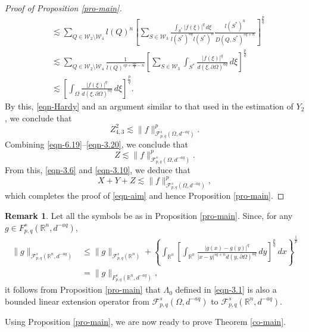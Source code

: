 \documentclass[11pt,twoside]{article}
\def\rn{{\mathbb{R}^n}}
\def\cf{{\mathcal F}}
\def\cw{\mathcal W}
\def\sxing{S^{*}}
\def\boz{{\Omega}}
\def\pa{\partial}                %
\def\huafwe{{\cf}_{p,q}^s(\boz,d^{-aq})}
\theoremstyle{mylem}
\theoremstyle{definition}
\newtheorem{remark}[theorem]{Remark}
\numberwithin{equation}{section}
\begin{document}
\begin{proof}[Proof of Proposition \ref{pro-main}]
\begin{align*}
&\lesssim \sum_{Q\in \cw_2\setminus\cw_4} l(Q)^n \left[\sum_{S\in\mathcal{W}_3} \frac{\int_{\sxing}|f(\xi)|^q \,d\xi}{l(\sxing)^{aq} l(\sxing)^n}  \frac{l(\sxing)^n}{D(Q,\sxing)^{sq+n}}\right]^{\frac{p}{q}} \\
&\lesssim \sum_{Q\in \cw_2\setminus\cw_4} \frac{1}{l(Q)^{sp+\frac{np}{q}-n}} \left[\sum_{S\in\mathcal{W}_3} \int_{\sxing} \frac{|f(\xi)|^q}{d(\xi,\pa\boz)^{aq}}\,d\xi \right]^{\frac{p}{q}} \\
&\lesssim \left[\int_{\boz} \frac{|f(\xi)|^q}{d(\xi,\pa\boz)^{aq}}\,d\xi \right]^{\frac{p}{q}}.
\end{align*}
By this, \eqref{eqn-Hardy} and an argument similar to that used in the estimation of $Y_2$, we conclude that
\begin{equation}\label{eqn-3.20}
Z_{4,3}^2\lesssim \| f \|_{\cf_{p,q}^{s}(\boz,d^{-aq})}^p.
\end{equation}
Combining \eqref{eqn-6.19}--\eqref{eqn-3.20}, we conclude that
\[
Z\lesssim \| f \|_{\cf_{p,q}^{s}(\boz,d^{-aq})}^p.
\] 
From this, \eqref{eqn-3.6} and \eqref{eqn-3.10}, we deduce that 
\[
X+Y+Z \lesssim \| f \|_{\cf_{p,q}^{s}(\boz,d^{-aq})}^{p},
\]
which completes the proof of \eqref{eqn-aim} and hence Proposition \ref{pro-main}.
\end{proof}

\begin{remark}
Let all the symbols be as in Proposition \ref{pro-main}.
Since, for any $g\in F_{p,q}^{s}(\rn,d^{-aq})$,
\begin{align*}
\|g\|_{\mathcal{F}_{p,q}^{s}(\rn,d^{-aq})}
&\leq\|g\|_{\cf_{p,q}^{s}(\rn)} +\left\{\int_{\rn} \left[ \int_{\rn} \frac{|g(x) -g(y)|^q}{|x - y|^{s q + n}d(y,\pa\boz)^{aq}}\,dy \right]^{\frac{p}{q}}\,dx \right\}^{\frac{1}{p}}\\
&=\|g \|_{F_{p,q}^{s}(\rn,d^{-aq})},
\end{align*}
it follows from Proposition \ref{pro-main}
that $\Lambda_0$ defined in \eqref{eqn-3.1}
is also a bounded linear extension operator
from $\huafwe$
to $\mathcal{F}_{p,q}^{s}(\rn,d^{-aq})$.
\end{remark}

Using Proposition \ref{pro-main}, we are now ready to prove Theorem \ref{co-main}.
\end{document}
